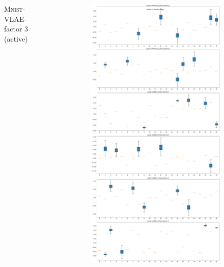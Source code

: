 \documentclass{beamer}
\begin{document}
\begin{frame}
\begin{columns}
\begin{column}{0.3\textwidth}
\begin{figure}
\caption{\textsc{Mnist}-VLAE-factor 3 (active)}
\end{figure}
\end{column}
\begin{column}{0.3\textwidth}
\begin{figure}
\centering
\includegraphics[height=.8\textheight]{images/sparseness/encoder_fm3_fms_inactive.png}

\end{figure}
\end{column}
\end{columns}
\end{frame}
\end{document}
